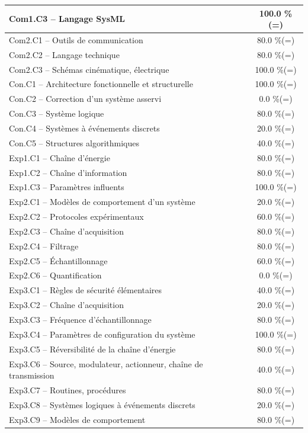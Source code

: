 \begin{center}
\begin{tabular}{|p{.7\linewidth}|c|}
Com1.C3 -- Langage SysML&100.0 \%(=)\\ \hline 
Com2.C1 -- Outils de communication&80.0 \%(=)\\ \hline 
Com2.C2 -- Langage technique&80.0 \%(=)\\ \hline 
Com2.C3 -- Schémas cinématique, électrique&100.0 \%(=)\\ \hline 
Con.C1 -- Architecture fonctionnelle et structurelle&100.0 \%(=)\\ \hline 
Con.C2 -- Correction d’un système asservi&0.0 \%(=)\\ \hline 
Con.C3 -- Système logique&80.0 \%(=)\\ \hline 
Con.C4 -- Systèmes à événements discrets&20.0 \%(=)\\ \hline 
Con.C5 -- Structures algorithmiques&40.0 \%(=)\\ \hline 
Exp1.C1 -- Chaîne d’énergie&80.0 \%(=)\\ \hline 
Exp1.C2 -- Chaîne d’information&80.0 \%(=)\\ \hline 
Exp1.C3 -- Paramètres influents&100.0 \%(=)\\ \hline 
Exp2.C1 -- Modèles de comportement d’un système&20.0 \%(=)\\ \hline 
Exp2.C2 -- Protocoles expérimentaux&60.0 \%(=)\\ \hline 
Exp2.C3 -- Chaîne d’acquisition&80.0 \%(=)\\ \hline 
Exp2.C4 -- Filtrage&80.0 \%(=)\\ \hline 
Exp2.C5 -- Échantillonnage&60.0 \%(=)\\ \hline 
Exp2.C6 -- Quantification&0.0 \%(=)\\ \hline 
Exp3.C1 -- Règles de sécurité élémentaires&40.0 \%(=)\\ \hline 
Exp3.C2 -- Chaîne d'acquisition&20.0 \%(=)\\ \hline 
Exp3.C3 -- Fréquence d’échantillonnage&80.0 \%(=)\\ \hline 
Exp3.C4 -- Paramètres de configuration du système&100.0 \%(=)\\ \hline 
Exp3.C5 -- Réversibilité de la chaîne d’énergie&80.0 \%(=)\\ \hline 
Exp3.C6 -- Source, modulateur, actionneur, chaîne de transmission&40.0 \%(=)\\ \hline 
Exp3.C7 -- Routines, procédures &80.0 \%(=)\\ \hline 
Exp3.C8 -- Systèmes logiques à événements discrets&20.0 \%(=)\\ \hline 
Exp3.C9 -- Modèles de comportement&80.0 \%(=)\\ \hline 

\end{tabular}
\end{center}
